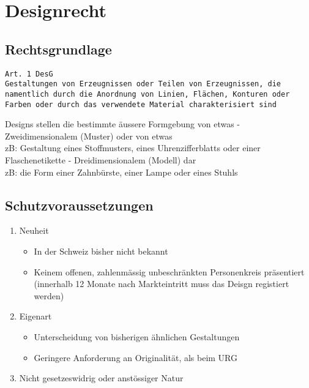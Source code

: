 \hypertarget{designrecht}{%
\section{Designrecht}\label{designrecht}}

\hypertarget{rechtsgrundlage}{%
\subsection{Rechtsgrundlage}\label{rechtsgrundlage}}

\begin{verbatim}
Art. 1 DesG
Gestaltungen von Erzeugnissen oder Teilen von Erzeugnissen, die namentlich durch die Anordnung von Linien, Flächen, Konturen oder Farben oder durch das verwendete Material charakterisiert sind
\end{verbatim}

Designs stellen die bestimmte äussere Formgebung von etwas -
Zweidimensionalem (Muster) oder von etwas\\
zB: Gestaltung eines Stoffmusters, eines Uhrenzifferblatts oder einer
Flaschenetikette - Dreidimensionalem (Modell) dar\\
zB: die Form einer Zahnbürste, einer Lampe oder eines Stuhls

\hypertarget{schutzvoraussetzungen}{%
\subsection{Schutzvoraussetzungen}\label{schutzvoraussetzungen}}

\begin{enumerate}
\def\labelenumi{\arabic{enumi}.}
\tightlist
\item
  Neuheit

  \begin{itemize}
  \tightlist
  \item
    In der Schweiz bisher nicht bekannt
  \item
    Keinem offenen, zahlenmässig unbeschränkten Personenkreis
    präsentiert (innerhalb 12 Monate nach Markteintritt muss das Deisgn
    registiert werden)
  \end{itemize}
\item
  Eigenart

  \begin{itemize}
  \tightlist
  \item
    Unterscheidung von bisherigen ähnlichen Gestaltungen
  \item
    Geringere Anforderung an Originalität, als beim URG
  \end{itemize}
\item
  Nicht gesetzeswidrig oder anstössiger Natur
\end{enumerate}

